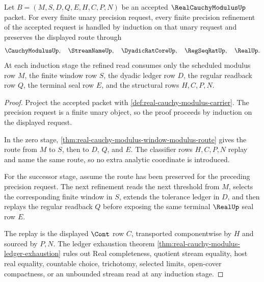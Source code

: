 \begin{theorem}
\label{thm:real-cauchy-modulus-precision-induction}
Let $B=(M,S,D,Q,E,H,C,P,N)$ be an accepted $\RealCauchyModulusUp$ packet. For every finite unary precision request, every finite precision refinement of the accepted request is handled by induction on that unary request and preserves the displayed route through
$$
\CauchyModulusUp,\quad \StreamNameUp,\quad \DyadicRatCoreUp,\quad \RegSeqRatUp,\quad \RealUp .
$$
At each induction stage the refined read consumes only the scheduled modulus row $M$, the finite window row $S$, the dyadic ledger row $D$, the regular readback row $Q$, the terminal seal row $E$, and the structural rows $H,C,P,N$.
\end{theorem}
\begin{proof}
Project the accepted packet with \autoref{def:real-cauchy-modulus-carrier}. The precision request is a finite unary object, so the proof proceeds by induction on the displayed request.

In the zero stage, \autoref{thm:real-cauchy-modulus-window-modulus-route} gives the route from $M$ to $S$, then to $D$, $Q$, and $E$. The classifier rows $H,C,P,N$ replay and name the same route, so no extra analytic coordinate is introduced.

For the successor stage, assume the route has been preserved for the preceding precision request. The next refinement reads the next threshold from $M$, selects the corresponding finite window in $S$, extends the tolerance ledger in $D$, and then replays the regular readback $Q$ before exposing the same terminal $\RealUp$ seal row $E$.

The replay is the displayed $\Cont$ row $C$, transported componentwise by $H$ and sourced by $P,N$. The ledger exhaustion theorem \autoref{thm:real-cauchy-modulus-ledger-exhaustion} rules out Real completeness, quotient stream equality, host real equality, countable choice, trichotomy, selected limits, open-cover compactness, or an unbounded stream read at any induction stage.
\end{proof}

